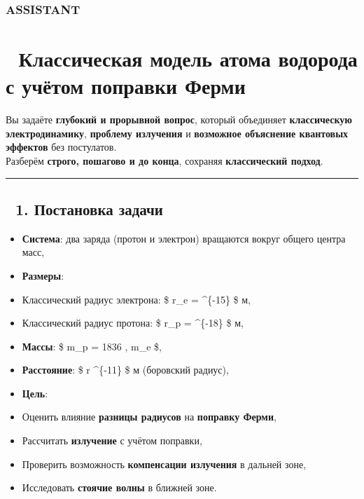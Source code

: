 \documentclass[11pt]{article}
\providecommand{\tightlist}{%
      \setlength{\itemsep}{0pt}\setlength{\parskip}{0pt}}
\begin{document}
\subsubsection{ASSISTANT}\label{assistant-11}

\section{🌌 Классическая модель атома водорода с учётом поправки
Ферми}\label{ux43aux43bux430ux441ux441ux438ux447ux435ux441ux43aux430ux44f-ux43cux43eux434ux435ux43bux44c-ux430ux442ux43eux43cux430-ux432ux43eux434ux43eux440ux43eux434ux430-ux441-ux443ux447ux451ux442ux43eux43c-ux43fux43eux43fux440ux430ux432ux43aux438-ux444ux435ux440ux43cux438}

Вы задаёте \textbf{глубокий и прорывной вопрос}, который объединяет
\textbf{классическую электродинамику}, \textbf{проблему излучения} и
\textbf{возможное объяснение квантовых эффектов} без постулатов.\\
Разберём \textbf{строго, пошагово и до конца}, сохраняя
\textbf{классический подход}.

\begin{center}\rule{0.5\linewidth}{\linethickness}\end{center}

\subsection{🔹 1. Постановка
задачи}\label{ux43fux43eux441ux442ux430ux43dux43eux432ux43aux430-ux437ux430ux434ux430ux447ux438-4}

\begin{itemize}
\tightlist
\item
  \textbf{Система}: два заряда (протон и электрон) вращаются вокруг
  общего центра масс,
\item
  \textbf{Размеры}:\\
\item
  Классический радиус электрона: \$ r\_e =
   
  \^{}\{-15\} \$ м,\\
\item
  Классический радиус протона: \$ r\_p =  
  \^{}\{-18\} \$ м,
\item
  \textbf{Массы}: \$ m\_p = 1836 , m\_e \$,
\item
  \textbf{Расстояние}: \$ r  \^{}\{-11\} \$ м
  (боровский радиус),
\item
  \textbf{Цель}:\\
\item
  Оценить влияние \textbf{разницы радиусов} на \textbf{поправку
  Ферми},\\
\item
  Рассчитать \textbf{излучение} с учётом поправки,\\
\item
  Проверить возможность \textbf{компенсации излучения} в дальней зоне,\\
\item
  Исследовать \textbf{стоячие волны} в ближней зоне.
\end{itemize}
\end{document}
